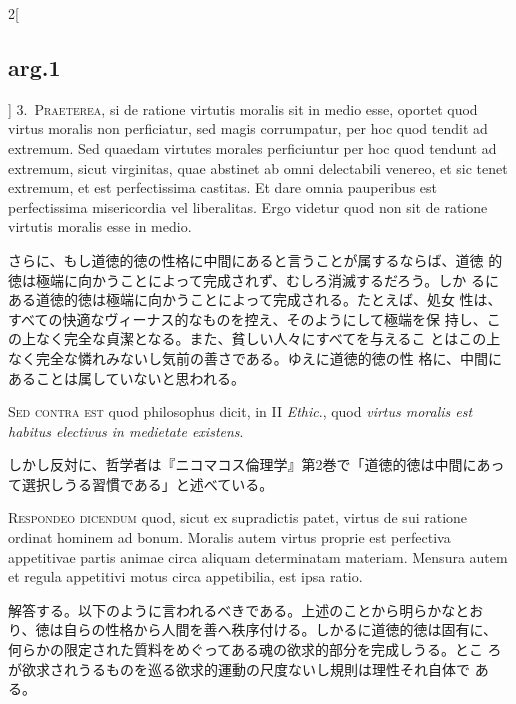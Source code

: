 \documentclass[paper=a4paper,fontsize=10pt,jafontsize=9pt,titlepage]{jlreq}
\begin{document}
\begin{paracol}{2}[\subsection{arg.1}]
3.~{\scshape Praeterea}, si de ratione virtutis moralis sit in medio
esse, oportet quod virtus moralis non perficiatur, sed magis
corrumpatur, per hoc quod tendit ad extremum. Sed quaedam virtutes
morales perficiuntur per hoc quod tendunt ad extremum, sicut
virginitas, quae abstinet ab omni delectabili venereo, et sic tenet
extremum, et est perfectissima castitas. Et dare omnia pauperibus est
perfectissima misericordia vel liberalitas. Ergo videtur quod non sit
de ratione virtutis moralis esse in medio.

\switchcolumn

さらに、もし道徳的徳の性格に中間にあると言うことが属するならば、道徳
 的徳は極端に向かうことによって完成されず、むしろ消滅するだろう。しか
 るにある道徳的徳は極端に向かうことによって完成される。たとえば、処女
 性は、すべての快適なヴィーナス的なものを控え、そのようにして極端を保
 持し、この上なく完全な貞潔となる。また、貧しい人々にすべてを与えるこ
 とはこの上なく完全な憐れみないし気前の善さである。ゆえに道徳的徳の性
 格に、中間にあることは属していないと思われる。

\switchcolumn*[\subsection{s.c.}]

{\scshape Sed contra est} quod philosophus dicit, in II {\itshape
Ethic}., quod {\itshape virtus moralis est habitus electivus in
medietate existens}.

\switchcolumn

しかし反対に、哲学者は『ニコマコス倫理学』第2巻で「道徳的徳は中間にあっ
 て選択しうる習慣である」と述べている。


{\scshape Respondeo dicendum} quod, sicut ex supradictis patet,
 virtus de sui ratione ordinat hominem ad bonum. Moralis autem virtus
 proprie est perfectiva appetitivae partis animae circa aliquam
 determinatam materiam. Mensura autem et regula appetitivi motus circa
 appetibilia, est ipsa ratio.

\switchcolumn

解答する。以下のように言われるべきである。上述のことから明らかなとお
 り、徳は自らの性格から人間を善へ秩序付ける。しかるに道徳的徳は固有に、
 何らかの限定された質料をめぐってある魂の欲求的部分を完成しうる。とこ
 ろが欲求されうるものを巡る欲求的運動の尺度ないし規則は理性それ自体で
 ある。


\end{paracol}
\end{document}
